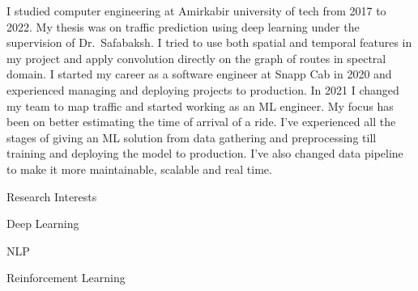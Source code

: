 

\begin{cvparagraph}
I studied computer engineering at Amirkabir university of tech from 2017 to 2022.
My thesis was on traffic prediction using deep learning under the supervision of Dr.\ Safabaksh.
I tried to use both spatial and temporal features in my project and apply
convolution directly on the graph of routes in spectral domain.
I started my career as a software engineer at Snapp Cab in 2020 and experienced managing
and deploying projects to production.
In 2021 I changed my team to map traffic and started working as an ML engineer.
My focus has been on better estimating the time of arrival of a ride.
I've experienced all the stages of giving an ML solution from data gathering and preprocessing
till training and deploying the model to production.
I've also changed data pipeline to make it more maintainable, scalable and real time.

\vspace{5mm}

  \cventry
    {}
    {Research Interests}
    {}
    {}
    {
      \begin{cvitems}
        \item Deep Learning
        \item NLP
        \item Reinforcement Learning
      \end{cvitems}
    }

\end{cvparagraph}
